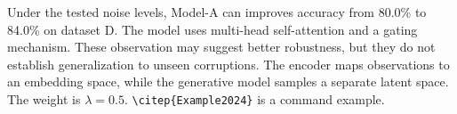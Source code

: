 \documentclass{article}
\newcommand{\modelname}{Model-A}
\begin{document}
Under the tested noise levels, \modelname{} can improves accuracy from
80.0\% to 84.0\% on dataset D. The model uses multi-head self-attention
and a gating mechanism. These observation may suggest better robustness,
but they do not establish generalization to unseen corruptions.
The encoder maps observations to an embedding space, while the generative
model samples a separate latent space. The weight is $\lambda=0.5$.
\verb|\citep{Example2024}| is a command example.
\end{document}
